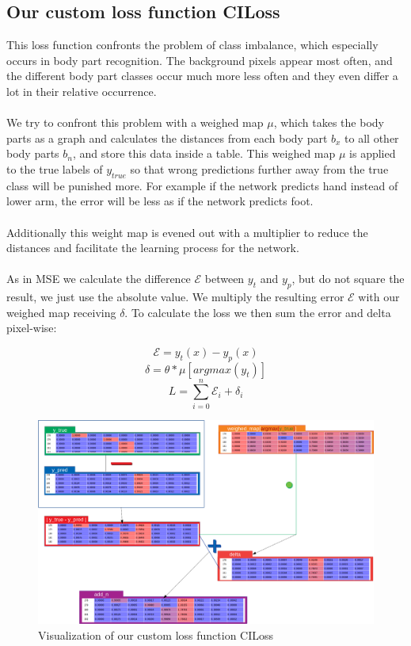 \subsection{Our custom loss function CILoss}
\label{ciloss}
This loss function confronts the problem of class imbalance, which especially occurs in body part recognition.
The background pixels appear most often, and the different body part classes occur much more less often and they even
differ a lot in their relative occurrence.
\\\mbox{}\\
We try to confront this problem with a weighed map $\mu$, which takes the body parts as a graph and calculates
the distances from each body part $b_x$ to all other body parts $b_n$, and store this data inside a table.
This weighed map $\mu$ is applied to the true labels of $y_{true}$ so that wrong predictions further away from the true
class will be punished more. For example if the network predicts hand instead of lower arm, the error will be less as if
the network predicts foot.
\\\mbox{}\\
Additionally this weight map is evened out with a multiplier to reduce the distances and facilitate
the learning process for the network.
\\\mbox{}\\
As in MSE we calculate the difference $\mathcal{E}$ between $y_t$ and $y_p$, but do not square the result, we just use the absolute value.
We multiply the resulting error $\mathcal{E}$ with our weighed map receiving $\delta$.
To calculate the loss we then sum the error and delta pixel-wise:

$$\mathcal{E}=y_t(x)-y_p(x)$$
$$\delta=\theta*\mu[argmax(y_t)] $$
$$L=\sum_{i=0}^{n}\mathcal{E}_i+\delta_i$$


\begin{figure}[H]
    \centering
    \includegraphics[width=\textwidth,height=\textheight,keepaspectratio]{img/loss_calculation.png}
    \decoRule
    \caption[CILoss]{Visualization of our custom loss function CILoss}
    \label{fig:ciloss-calc}
\end{figure}

